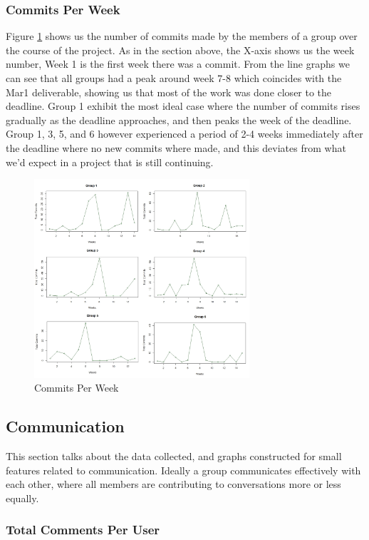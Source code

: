 \documentclass{acm_proc_article-sp}
\begin{document}
\subsubsection{Commits Per Week}
Figure \ref{fig:commitsPerWeek} shows us the number of commits made by the members of a group over the course of the project. As in the section above, the X-axis shows us the week number, Week 1 is the first week there was a commit. From the line graphs we can see that all groups had a peak around week 7-8 which coincides with the Mar1 deliverable, showing us that most of the work was done closer to the deadline. Group 1 exhibit the most ideal case where the number of commits rises gradually as the deadline approaches, and then peaks the week of the deadline. Group 1, 3, 5, and 6 however experienced a period of 2-4 weeks immediately after the deadline where no new commits where made, and this deviates from what we'd expect in a project that is still continuing.

\begin{figure}[h]
\centering
\includegraphics[width=8cm]{img/commitsPerWeek}
\caption{Commits Per Week}
\label{fig:commitsPerWeek}
\end{figure}

\subsection{Communication}

This section talks about the data collected, and graphs constructed for small features related to communication. Ideally a group communicates effectively with each other, where all members are contributing to conversations more or less equally.

\subsubsection{Total Comments Per User}
\end{document}
